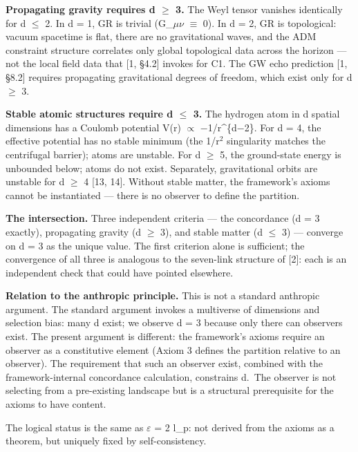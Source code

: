 \documentclass[
  11pt,
]{article}
\begin{document}
\textbf{Propagating gravity requires d \ensuremath{\geq} 3.} The Weyl tensor vanishes
identically for d \ensuremath{\leq} 2. In d = 1, GR is trivial (G\_\ensuremath{\mu}\ensuremath{\nu} \ensuremath{\equiv} 0). In d = 2, GR
is topological: vacuum spacetime is flat, there are no gravitational
waves, and the ADM constraint structure correlates only global
topological data across the horizon --- not the local field data that
{[}1, §4.2{]} invokes for C1. The GW echo prediction {[}1, §8.2{]}
requires propagating gravitational degrees of freedom, which exist only
for d \ensuremath{\geq} 3.

\textbf{Stable atomic structures require d \ensuremath{\leq} 3.} The hydrogen atom in d
spatial dimensions has a Coulomb potential V(r) \ensuremath{\propto} \ensuremath{-}1/r\^{}\{d\ensuremath{-}2\}. For d
= 4, the effective potential has no stable minimum (the 1/r\ensuremath{^2} singularity
matches the centrifugal barrier); atoms are unstable. For d \ensuremath{\geq} 5, the
ground-state energy is unbounded below; atoms do not exist. Separately,
gravitational orbits are unstable for d \ensuremath{\geq} 4 {[}13, 14{]}. Without stable
matter, the framework's axioms cannot be instantiated --- there is no
observer to define the partition.

\textbf{The intersection.} Three independent criteria --- the
concordance (d = 3 exactly), propagating gravity (d \ensuremath{\geq} 3), and stable
matter (d \ensuremath{\leq} 3) --- converge on d = 3 as the unique value. The first
criterion alone is sufficient; the convergence of all three is analogous
to the seven-link structure of {[}2{]}: each is an independent check
that could have pointed elsewhere.

\textbf{Relation to the anthropic principle.} This is not a standard
anthropic argument. The standard argument invokes a multiverse of
dimensions and selection bias: many d exist; we observe d = 3 because
only there can observers exist. The present argument is different: the
framework's axioms require an observer as a constitutive element (Axiom
3 defines the partition relative to an observer). The requirement that
such an observer exist, combined with the framework-internal concordance
calculation, constrains d.~The observer is not selecting from a
pre-existing landscape but is a structural prerequisite for the axioms
to have content.

The logical status is the same as \ensuremath{\varepsilon} = 2 l\_p: not derived from the
axioms as a theorem, but uniquely fixed by self-consistency.
\end{document}
